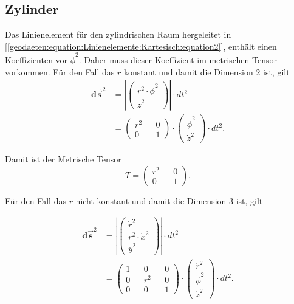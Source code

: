 %
%
%
%
\subsection{Zylinder\label{geodaeten:section:MetZylinder}}

Das Linienelement für den zylindrischen Raum hergeleitet in [\ref{geodaeten:equation:Linienelemente:Kartesisch:equation2}], enthält einen Koeffizienten vor $\dot{\phi} ^2$.
Daher muss dieser Koeffizient im metrischen Tensor vorkommen.
Für den Fall das $r$ konstant und damit die Dimension 2 ist, gilt
\begin{equation}
	\begin{aligned}
	\mathbf{d\vec{s}}^2 &= \left| \begin{pmatrix} r^2 \cdot \dot{\phi}^2 \\ \dot{z}^2 \end{pmatrix} \right| \cdot dt^2 \\
	&= \begin{pmatrix} r^2 && 0 \\ 0 && 1 \end{pmatrix} \cdot \begin{pmatrix} \dot{\phi}^2 \\ \dot{z}^2 \end{pmatrix} \cdot dt^2 .
	\end{aligned}
\end{equation}

Damit ist der Metrische Tensor 
\begin{equation}
		T = \begin{pmatrix} r^2 && 0 \\ 0 && 1 \end{pmatrix} .
\end{equation}

Für den Fall das $r$ nicht konstant und damit die Dimension 3 ist, gilt

\begin{equation}
	\begin{aligned}
	\mathbf{d\vec{s}}^2 &= \left| \begin{pmatrix} \dot{r}^2 \\ r^2 \cdot \dot{x}^2 \\ \dot{y}^2 \end{pmatrix} \right| \cdot dt^2 \\
	&= \begin{pmatrix} 1 && 0 && 0 \\ 0 && r^2 && 0 \\ 0 && 0 && 1 \end{pmatrix} \cdot \begin{pmatrix} \dot{r}^2 \\ \dot{\phi}^2 \\ \dot{z}^2\end{pmatrix} \cdot dt^2 .
	\end{aligned}
\end{equation}

